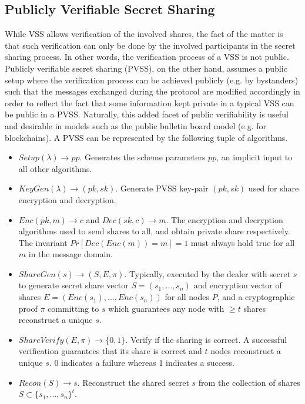 \documentclass[11pt]{article}
\theoremstyle{definition}
\theoremstyle{remark}
\begin{document}
\subsection{Publicly Verifiable Secret Sharing}
While VSS allows verification of the involved shares, the fact of the matter is that such verification can only be done by the involved participants in the secret sharing process. In other words, the verification process of a VSS is not public. Publicly verifiable secret sharing (PVSS), on the other hand, assumes a public setup where the verification process can be achieved publicly (e.g. by bystanders) such that the messages exchanged during the protocol are modified accordingly in order to reflect the fact that some information kept private in a typical VSS can be public in a PVSS. Naturally, this added facet of public verifiability is useful and desirable in models such as the public bulletin board model (e.g. for blockchains). A PVSS can be represented by the following tuple of algorithms.
\begin{itemize}
\item $Setup(\lambda) \rightarrow pp$. Generates the scheme parameters $pp$, an implicit input to all other algorithms.
\item $KeyGen(\lambda) \rightarrow (pk, sk)$. Generate PVSS key-pair $(pk, sk)$ used for share encryption and decryption.
\item $Enc(pk, m) \rightarrow c$ and $Dec(sk, c) \rightarrow m$. The encryption and decryption algorithms used to send shares to all, and obtain private share respectively. The invariant $Pr[Dec(Enc(m)) = m] = 1$ must always hold true for all $m$ in the message domain.
\item $ShareGen(s) \rightarrow (S, E, \pi)$. Typically, executed by the dealer with secret $s$ to generate secret share vector $S = (s_1, ..., s_n)$ and encryption vector of shares $E = (Enc(s_1), ..., Enc(s_n))$ for all nodes $P$, and a cryptographic proof $\pi$ committing to $s$ which guarantees any node with $\geq t$ shares reconstruct a unique $s$.
\item $ShareVerify(E, \pi) \rightarrow \{0, 1\}$. Verify if the sharing is correct. A successful verification guarantees that its share is correct and $t$ nodes reconstruct a unique $s$. 0 indicates a failure whereas 1 indicates a success.
\item $Recon(S) \rightarrow s$. Reconstruct the shared secret $s$ from the collection of shares $S \subset \{s_1, ..., s_n\}^{t}$.
\end{itemize}
\end{document}
